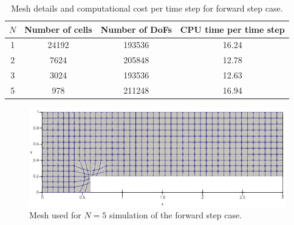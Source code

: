 \documentclass[a4paper,11pt,oneside]{article}
\begin{document}
\begin{table}[htbp]
	\centering
	\caption{Mesh details and computational cost per time step for forward step case.}
	\label{tab:forward_facing_step_mesh_cpu}
	\begin{tabular}{cccc}
		\toprule
		$N$ & Number of cells & Number of DoFs & CPU time per time step \\
		\midrule
		1 & 24192 & 193536 & 16.24 \\
		2 & 7624 & 205848 & 12.78 \\
		3 & 3024 & 193536 & 12.63 \\
		5 & 978 & 211248 & 16.94 \\
		\bottomrule
	\end{tabular}
\end{table}

\begin{figure}[htbp]
	\centering
	\includegraphics[width=0.8\linewidth]{figures/forward_facing_step/mesh_N5}
	\caption{Mesh used for $N=5$ simulation of the forward step case.}
	\label{fig:forward_facing_step_mesh_N5}
\end{figure}
\end{document}
